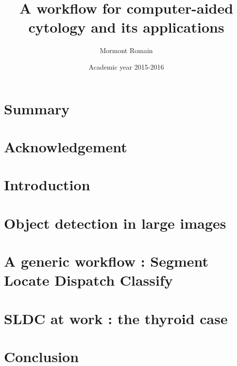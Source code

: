 \documentclass[a4paper,11pt]{report}
\author{Mormont Romain}
\title{A workflow for computer-aided cytology and its applications}
\date{Academic year 2015-2016}
\begin{document}
	
	
	
	\newpage
	
	\tableofcontents
	
	\newpage

	\chapter*{Summary}
	
	\newpage
	
	\chapter*{Acknowledgement}
	
	\newpage
	
	\setcounter{page}{1}
	\chapter{Introduction}
	
	\newpage
	
	\chapter{Object detection in large images}
	
	\newpage
	
	\chapter{A generic workflow : Segment Locate Dispatch Classify}
	
	\newpage
	
	\chapter{SLDC at work : the thyroid case}
	
	\newpage
	
	\chapter{Conclusion}
	

	
	\appendix
	\listoftables
	
	\listoffigures
	
	\printbibliography[heading=bibintoc]
\end{document}
